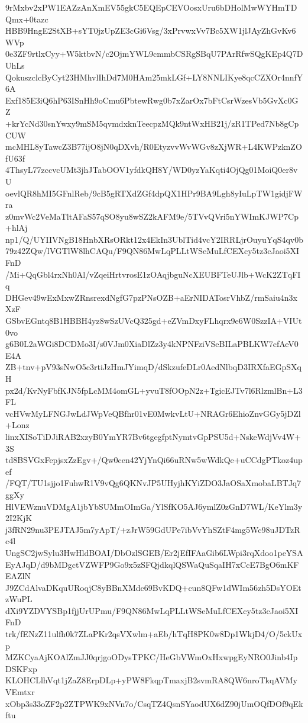 9rMxbv2xPW1EAZzAnXmEV55gkC5EQEpCEVOosxUru6bDHolMwWYHmTDQmx+0tazc
HBB9HngE2StXB+sYT0jzUpZE3cGi6Vsg/3xPrvwxVv7Bc5XW1jlJAyZhGvKv6WVp
0e3ZF9rtlxCyy+W5ktbvN/c2OjmYWL9cmmbCSRgSBqU7PArRfwSQgKEp4Q7DUhLs
QokuszclcByCyt23HMhvlIhDd7M0HAm25mkLGf+LY8NNLIKye8qcCZXOr4nnfY6A
Exf185E3iQ6hP63ISnHh9oCmu6PbtewRwg0b7xZarOx7bFtCsrWzesVb5GvXc0GZ
+krYcNd30snYwxy9mSM5qvmdxknTeecpzMQk9ntWxHB21j/zR1TPed7Nb8gCpCUW
mcMHL8yTawcZ3B77ijO8jN0qDXvh/R0EtyzvvWvWGv8zXjWR+L4KWPzknZOfU63f
4ThsyL77zccvcUMt3jhJTabOOV1yfdkQH8Y/WD0yzYaKqti4OjQg01MoiQ0er8vU
oevlQR8hMI5GFnlReb/9cB5gRTXdZGf4dpQX1HPr9BA9Lgh8yIuLpTW1gidjFWra
z0mvWc2VeMaTltAFaS57qSO8yu8wSZ2kAFM9e/5TVvQVri5nYWImKJWP7Cp+hlAj
np1/Q/UYIIVNgB18HnbXRsORkt12x4EkIn3UblTid4vcY2IRRLjrOuyuYqS4qv0b
79z42ZQw/lVGTlW8lhCAQu/F9QN86MwLqPLLtWSeMuLfCEXcy5tz3cJaoi5XIFnD
/Mi+QqGbl4rxNh0Al/vZqeiHrtvrosE1zOAqjbguNcXEUBFTeUJlb+WcK2ZTqFIq
DHGev49wExMxwZRnsrexdNgfG7pzPNsOZB+aErNIDATosrVhbZ/rmSaiu4n3xXzF
GSbvEGntq8B1HBBH4yz8wSzUVcQ325gd+eZVmDxyFLhqrx9e6W0SzzIA+VIUt0vo
g6B0L2aWGi8DCDMo3I/s0VJm0XiaDlZz3y4kNPNFziVSeBILaPBLKW7cfAeV0E4A
ZB+tnv+pV93sNwO5c3rtiJzHmJYimqD/dSkzufeDLr0AedNlbqD3IRXfaEGpSXqH
px2d/KvNyFbfKJN5fpLcMM4omGL+yvuT8fOOpN2z+TgicEJTv7l6RlzmlBn+L3FL
vcHVwMyLFNGJwLdJWpVeQBfhr01vE0MwkvLtU+NRAGr6EhioZnvGGy5jDZl+Lonz
linxXISoTiDJiRAB2xzyB0YmYR7Bv6tgegfptNymtvGpPSU5d+NskeWdjVv4W+3S
td8BSVGxFepjsxZzEgv+/Qw0cen42YjYnQi66uRNw5wWdkQe+uCCdgPTkoz4upef
/FQT/TU1sjjo1FuhwR1V9vQg6QKNvJP5UHyjhKYiZDO3JaOSaXmobaLBTJq7ggXy
HlVEWznuVDMgA1jbYbSUMmOImGa/YlSfKO5AJ6ymlZ0zGnD7WL/KeYlm3y2I2KjK
j3fRN29nu3PEJTAJ5m7yApT/+zJrW59GdUPe7ibVvYhSZtF4mg5Wc98uJDTzRc4l
UngSC2jwSylu3HwHldBOAI/DbOzlSGEB/Er2jEfIFAaGib6LWpi3rqXdoo1peYSA
EyAJqD/d9bMDgctVZWFP9Go9x5zSFQjdkqlQSWaQuSqaIH7xCcE7BgO6mKFEAZlN
J9ZCdAlvaDKquURoqjC8yBBnXMdc69BvKDQ+cun8QFw1dWIm56zh5DsYOEtzWuPL
dXi9YZDVYSBp1fjjUrUPmu/F9QN86MwLqPLLtWSeMuLfCEXcy5tz3cJaoi5XIFnD
trk/fENzZ11ulfh0k7ZLaPKr2qsVXwlm+aEb/hTqH8PK0w8Dp1WkjD4/O/5ckUxp
MZKCyaAjKOAlZmJJ0qrjgoODysTPKC/HeGbVWmOxHxwpgEyNRO0Jinb4IpDSKFxp
KLOHCLlhVqt1jZaZ8ErpDLp+yPW8FkqpTmaxjB2svmRA8QW6nroTkqAVMyVEmtxr
xObp3s33oZF2p2ZTPWK9xNVn7o/CsqTZ4QsnSYaodUX6dZ90jUmOQfDOf9qEkftu
